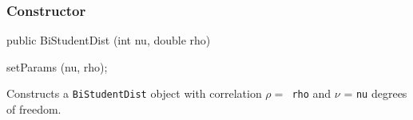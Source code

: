\subsubsection* {Constructor}

\begin{code}

   public BiStudentDist (int nu, double rho) \begin{hide} {
      setParams (nu, rho);
   }\end{hide}
\end{code}
\begin{tabb}
 Constructs a \texttt{BiStudentDist} object with correlation $\rho = $\texttt{ rho}
  and $\nu$ = \texttt{nu} degrees of freedom.
  \end{tabb}


